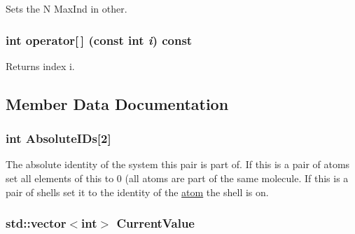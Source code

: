 Sets the N MaxInd in other. \hypertarget{classJKBuilder_1_1Iterator_a74247cf730a06b23fcb1ec64e5596b25}{
\subsubsection[{operator[]}]{\setlength{\rightskip}{0pt plus 5cm}int operator\mbox{[}$\,$\mbox{]} (const int {\em i}) const}}
\label{classJKBuilder_1_1Iterator_a74247cf730a06b23fcb1ec64e5596b25}


Returns index i. 

\subsection{Member Data Documentation}
\hypertarget{classJKBuilder_1_1PairIterator_a5c96d22e39dea8044c7caf8c1213e813}{
\subsubsection[{AbsoluteIDs}]{\setlength{\rightskip}{0pt plus 5cm}int {\bf AbsoluteIDs}\mbox{[}2\mbox{]}}}
\label{classJKBuilder_1_1PairIterator_a5c96d22e39dea8044c7caf8c1213e813}


The absolute identity of the system this pair is part of. If this is a pair of atoms set all elements of this to 0 (all atoms are part of the same molecule. If this is a pair of shells set it to the identity of the \hyperlink{classJKBuilder_1_1atom}{atom} the shell is on. \hypertarget{classJKBuilder_1_1Iterator_a20ca24f6d827aba144bb087c4bcb74a0}{
\subsubsection[{CurrentValue}]{\setlength{\rightskip}{0pt plus 5cm}std::vector$<$int$>$ {\bf CurrentValue}}}
\label{classJKBuilder_1_1Iterator_a20ca24f6d827aba144bb087c4bcb74a0}


